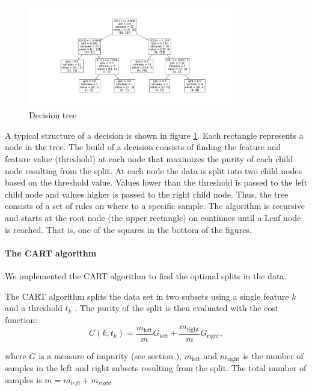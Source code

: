 \begin{figure}[H]
    \centering
    \includegraphics[width=0.8\textwidth]{Figures/descion_tree.png}
    \caption{Decision tree}  
    \label{fig:descision_tree} 
\end{figure}

A typical structure of a decision is shown in figure \ref{fig:descision_tree}. Each rectangle
represents a node in the tree. The build of a decision consists of finding
the feature and feature value (threshold) at each node that maximizes the
purity of each child node resulting from the split. At each node the data is
split into two child nodes based on the threshold value. Values lower than the threshold is
passed to the left child node and values higher is passed to the right child
node. Thus, the tree consists of a set of rules on where to a specific sample. The algorithm is recursive and starts at the
root node (the upper rectangle) on continues until a Leaf node is reached.
That is, one of the squares in the bottom of the figures.     


\paragraph{The CART algorithm} \hfill

We implemented the CART algorithm to find the optimal splits in the data.  

The CART algorithm splits the data set in two subsets using a single feature
$k$ and a threshold $t_k$ \cite{w44}. The purity of the split is then evaluated
with the cost function: 
\begin{equation*}
    \label{eq:cart} 
    C(k, t_k) = \frac{m_{\text{left}} }{m} G_{\text{left}}+
    \frac{m_{\text{right}} }{m} G_{\text{right}}, 
\end{equation*}

where $G$ is a measure of impurity (see section ),
$m_{\text{left}} $ and $m_{\text{right}} $ is the number of samples in the left
and right subsets resulting from the split. The total number of samples is $m =
m_{left} + m_{right}  $ 

